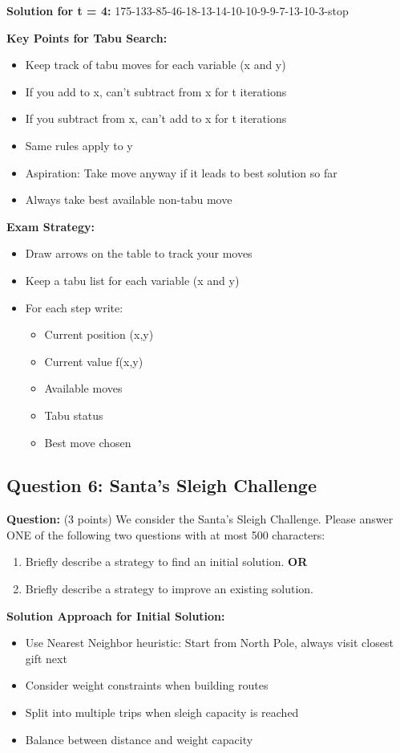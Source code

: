 \begin{enumerate}[label=\alph*)]
\textbf{Solution for t = 4:} 175-133-85-46-18-13-14-10-10-9-9-7-13-10-3-stop

\textbf{Key Points for Tabu Search:}
\begin{itemize}
\item Keep track of tabu moves for each variable (x and y)
\item If you add to x, can't subtract from x for t iterations
\item If you subtract from x, can't add to x for t iterations
\item Same rules apply to y
\item Aspiration: Take move anyway if it leads to best solution so far
\item Always take best available non-tabu move
\end{itemize}

\textbf{Exam Strategy:}
\begin{itemize}
\item Draw arrows on the table to track your moves
\item Keep a tabu list for each variable (x and y)
\item For each step write:
  \begin{itemize}
  \item Current position (x,y)
  \item Current value f(x,y)
  \item Available moves
  \item Tabu status
  \item Best move chosen
  \end{itemize}
\end{itemize}
\end{enumerate}

\subsection{Question 6: Santa's Sleigh Challenge}
\textbf{Question:} (3 points) We consider the Santa's Sleigh Challenge. Please answer ONE of the following two questions with at most 500 characters:

\begin{enumerate}[label=\alph*)]
\item Briefly describe a strategy to find an initial solution.
\textbf{OR}
\item Briefly describe a strategy to improve an existing solution.
\end{enumerate}

\textbf{Solution Approach for Initial Solution:}
\begin{itemize}
\item Use Nearest Neighbor heuristic: Start from North Pole, always visit closest gift next
\item Consider weight constraints when building routes
\item Split into multiple trips when sleigh capacity is reached
\item Balance between distance and weight capacity
\end{itemize}

